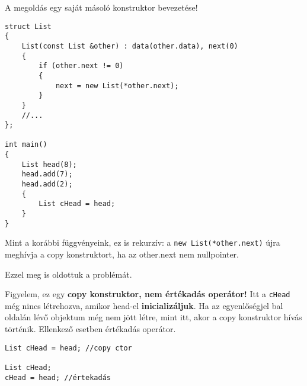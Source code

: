 \documentclass[a4paper,11.5pt,table]{article}
\begin{document}
	A megoldás egy saját másoló konstruktor bevezetése!
	
	
\begin{lstlisting}
struct List
{
	List(const List &other) : data(other.data), next(0)
	{
		if (other.next != 0)
		{
			next = new List(*other.next);
		}
	}
	//...
};

int main()
{
	List head(8);
	head.add(7);
	head.add(2);
	{
		List cHead = head;
	}
}
\end{lstlisting}
	Mint a korábbi függvényeink, ez is rekurzív: a \texttt{new List(*other.next)} újra meghívja a copy konstruktort, ha az other.next nem nullpointer.
	\begin{figure}[!h]
		\centering
	\end{figure}
	
	\medskip
	Ezzel meg is oldottuk a problémát. 
	
	Figyelem, ez egy \textbf{copy konstruktor, nem értékadás operátor!} Itt a \texttt{cHead} még nincs létrehozva, amikor head-el \textbf{inicializáljuk}. Ha az egyenlőségjel bal oldalán lévő objektum még nem jött létre, mint itt, akor a copy konstruktor hívás történik. Ellenkező esetben értékadás operátor.
	\begin{lstlisting}
List cHead = head; //copy ctor

List cHead;
cHead = head; //értekadás
	\end{lstlisting}
	
\end{document}

